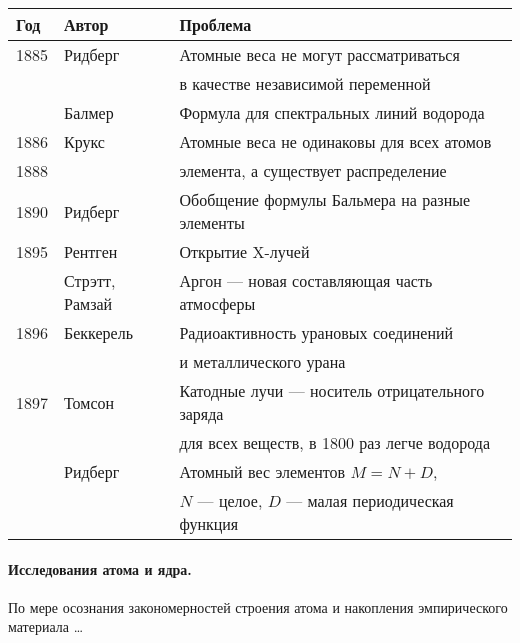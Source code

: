 \documentclass[a5paper,openany]{book}
\begin{document}
	{\small	
			\begin{tabular}{l|l|l}
				Год & Автор	& Проблема \\
				\hline
				1885 & Ридберг & {\color{red}Атомные веса не могут рассматриваться} \\
				~ & ~ & {\color{red} в качестве независимой переменной} \\	
				~ & Балмер & Формула для спектральных линий водорода \\	
				1886 & Крукс & {\color{red}Атомные веса не одинаковы для всех атомов } \\
				1888 & ~ &   {\color{red}элемента, а существует распределение }\\
				1890 & Ридберг & Обобщение формулы Бальмера на разные элементы \\	
				1895 & Рентген & Открытие X-лучей \\
				~ & Стрэтт, Рамзай & Аргон --- новая составляющая часть атмосферы \\
				1896 & Беккерель & Радиоактивность урановых соединений  \\
				~ & ~ &  и металлического урана\\
				1897 & Томсон & Катодные лучи --- носитель отрицательного заряда  \\
				~ & ~ &  для всех веществ, в 1800 раз легче водорода\\	
				~ & Ридберг & {\color{red}Атомный вес элементов $M = N+D$,} \\	
				~ & ~ &  {\color{red}$N$ --- целое, $D$ --- малая периодическая функция}\\			
				\hline
			\end{tabular}
		}
		
		\paragraph{Исследования атома и ядра.} По мере осознания закономерностей строения атома и накопления эмпирического материала \ldots
		
\end{document}
